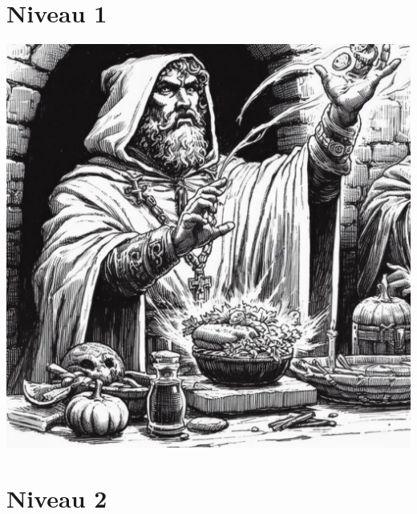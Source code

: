 \section{Niveau 1}



\vspace*{\fill}\columnbreak


\vspace*{\fill}\columnbreak


\vspace*{\fill}\columnbreak


\vspace*{25pt}
\includegraphics[width=\columnwidth]{img/purification.jpg}

\newpage
\section{Niveau 2}



\vspace*{\fill}\columnbreak



\vspace*{\fill}\columnbreak

\vspace*{\fill}\columnbreak


